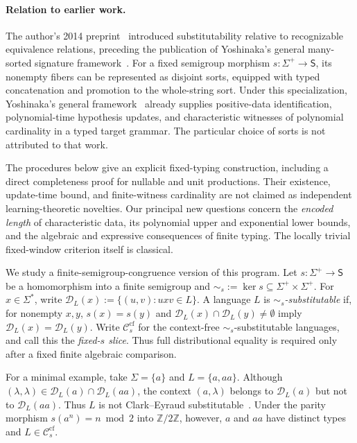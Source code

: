 \documentclass[11pt,a4paper]{article}
\theoremstyle{remark}
\theoremstyle{plain}
\newcommand{\D}{\mathcal{D}}
\newcommand{\cf}{\mathrm{cf}}
\newcommand{\Ccf}[1]{\mathcal C_{#1}^{\cf}}
\begin{document}
\paragraph{Relation to earlier work.}
The author's 2014 preprint~\cite{kuriyama2014} introduced
substitutability relative to recognizable equivalence relations,
preceding the publication of Yoshinaka's general many-sorted
signature framework~\cite{yoshinaka2015}.
For a fixed semigroup morphism $s:\Sigma^+\to\mathsf S$,
its nonempty fibers can be represented as disjoint sorts,
equipped with typed concatenation and promotion to the
whole-string sort. Under this specialization, Yoshinaka's
general framework~\cite[Theorem~1 and Lemma~3]{yoshinaka2015}
already supplies positive-data identification, polynomial-time
hypothesis updates, and characteristic witnesses of polynomial
cardinality in a typed target grammar. The particular choice
of sorts is not attributed to that work.

The procedures below give an explicit fixed-typing construction,
including a direct completeness proof for nullable and unit
productions. Their existence, update-time bound, and finite-witness
cardinality are not claimed as independent learning-theoretic
novelties. Our principal new questions concern the \emph{encoded
length} of characteristic data, its polynomial upper and
exponential lower bounds, and the algebraic and expressive
consequences of finite typing. The locally trivial fixed-window
criterion itself is classical.

We study a finite-semigroup-congruence version of this program.  Let
$s:\Sigma^+\to\mathsf S$ be a homomorphism into a finite semigroup and
$\sim_s:=\ker s\subseteq\Sigma^+\times\Sigma^+$.  For $x\in\Sigma^*$, write
$\D_L(x):=\{(u,v):uxv\in L\}$.  A language $L$ is
\emph{$\sim_s$-substitutable} if, for nonempty $x,y$,
$s(x)=s(y)$ and $\D_L(x)\cap\D_L(y)\ne\emptyset$ imply
$\D_L(x)=\D_L(y)$. Write $\Ccf{s}$ for the context-free
$\sim_s$-substitutable languages, and call this the \emph{fixed-$s$ slice}.
Thus full distributional equality is required only after a fixed finite
algebraic comparison.

For a minimal example, take $\Sigma=\{a\}$ and $L=\{a,aa\}$.
Although $(\lambda,\lambda)\in\D_L(a)\cap\D_L(aa)$,
the context $(a,\lambda)$ belongs to $\D_L(a)$ but not to $\D_L(aa)$.
Thus $L$ is not Clark--Eyraud substitutable~\cite[Section~6.1]{clark-eyraud2007}.
Under the parity morphism $s(a^n)=n\bmod 2$ into
$\mathbb Z/2\mathbb Z$, however, $a$ and $aa$ have distinct types
and $L\in\Ccf{s}$.
\end{document}
